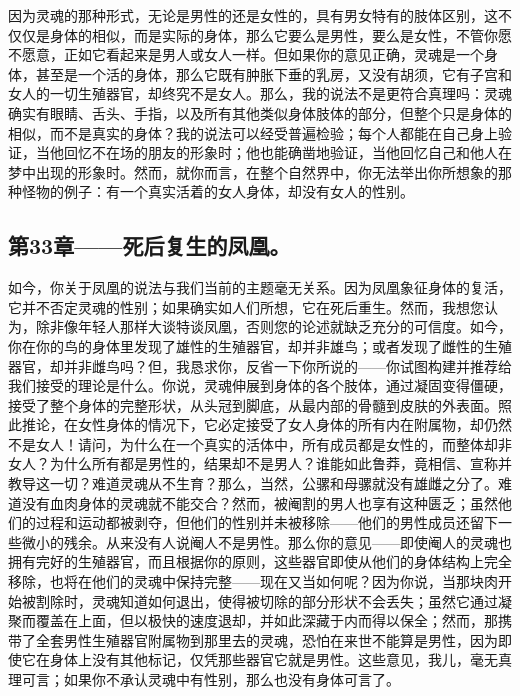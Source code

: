 因为灵魂的那种形式，无论是男性的还是女性的，具有男女特有的肢体区别，这不仅仅是身体的相似，而是实际的身体，那么它要么是男性，要么是女性，不管你愿不愿意，正如它看起来是男人或女人一样。但如果你的意见正确，灵魂是一个身体，甚至是一个活的身体，那么它既有肿胀下垂的乳房，又没有胡须，它有子宫和女人的一切生殖器官，却终究不是女人。那么，我的说法不是更符合真理吗：灵魂确实有眼睛、舌头、手指，以及所有其他类似身体肢体的部分，但整个只是身体的相似，而不是真实的身体？我的说法可以经受普遍检验；每个人都能在自己身上验证，当他回忆不在场的朋友的形象时；他也能确凿地验证，当他回忆自己和他人在梦中出现的形象时。然而，就你而言，在整个自然界中，你无法举出你所想象的那种怪物的例子：有一个真实活着的女人身体，却没有女人的性别。\par


\subsection{第33章——死后复生的凤凰。}

如今，你关于凤凰的说法与我们当前的主题毫无关系。因为凤凰象征身体的复活，它并不否定灵魂的性别；如果确实如人们所想，它在死后重生。然而，我想您认为，除非像年轻人那样大谈特谈凤凰，否则您的论述就缺乏充分的可信度。如今，你在你的鸟的身体里发现了雄性的生殖器官，却并非雄鸟；或者发现了雌性的生殖器官，却并非雌鸟吗？但，我恳求你，反省一下你所说的——你试图构建并推荐给我们接受的理论是什么。你说，灵魂伸展到身体的各个肢体，通过凝固变得僵硬，接受了整个身体的完整形状，从头冠到脚底，从最内部的骨髓到皮肤的外表面。照此推论，在女性身体的情况下，它必定接受了女人身体的所有内在附属物，却仍然不是女人！请问，为什么在一个真实的活体中，所有成员都是女性的，而整体却非女人？为什么所有都是男性的，结果却不是男人？谁能如此鲁莽，竟相信、宣称并教导这一切？难道灵魂从不生育？那么，当然，公骡和母骡就没有雄雌之分了。难道没有血肉身体的灵魂就不能交合？然而，被阉割的男人也享有这种匮乏；虽然他们的过程和运动都被剥夺，但他们的性别并未被移除——他们的男性成员还留下一些微小的残余。从来没有人说阉人不是男性。那么你的意见——即使阉人的灵魂也拥有完好的生殖器官，而且根据你的原则，这些器官即使从他们的身体结构上完全移除，也将在他们的灵魂中保持完整——现在又当如何呢？因为你说，当那块肉开始被割除时，灵魂知道如何退出，使得被切除的部分形状不会丢失；虽然它通过凝聚而覆盖在上面，但以极快的速度退却，并如此深藏于内而得以保全；然而，那携带了全套男性生殖器官附属物到那里去的灵魂，恐怕在来世不能算是男性，因为即使它在身体上没有其他标记，仅凭那些器官它就是男性。这些意见，我儿，毫无真理可言；如果你不承认灵魂中有性别，那么也没有身体可言了。\par

